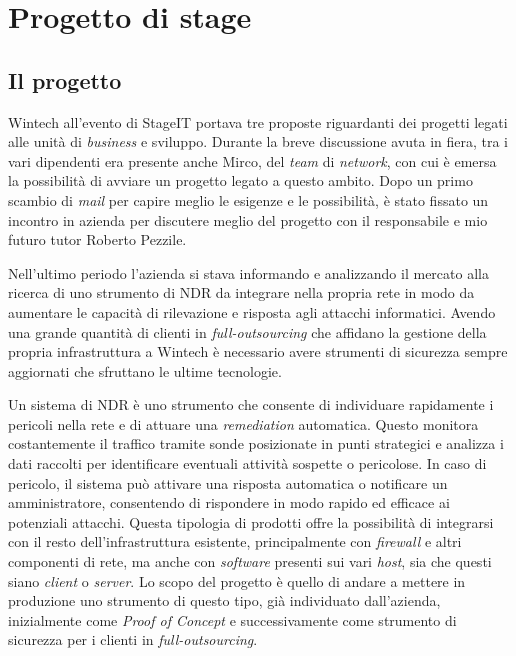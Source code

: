 \chapter{Progetto di stage}
\label{cap:stage}

\section{Il progetto}

Wintech all'evento di StageIT portava tre proposte riguardanti dei progetti legati alle unità di \emph{business} e sviluppo. Durante la breve discussione avuta in fiera, tra i vari dipendenti era presente anche Mirco, del \emph{team} di \emph{network}, con cui è emersa la possibilità di avviare un progetto legato a questo ambito. Dopo un primo scambio di \emph{mail} per capire meglio le esigenze e le possibilità, è stato fissato un incontro in azienda per discutere meglio del progetto con il responsabile e mio futuro tutor Roberto Pezzile.

Nell'ultimo periodo l'azienda si stava informando e analizzando il mercato alla ricerca di uno strumento di NDR da integrare nella propria rete in modo da aumentare le capacità di rilevazione e risposta agli attacchi informatici. Avendo una grande quantità di clienti in \emph{full-outsourcing} che affidano la gestione della propria infrastruttura a Wintech è necessario avere strumenti di sicurezza sempre aggiornati che sfruttano le ultime tecnologie.

Un sistema di NDR è uno strumento che consente di individuare rapidamente i pericoli nella rete e di attuare una \emph{remediation} automatica. Questo monitora costantemente il traffico tramite sonde posizionate in punti strategici e analizza i dati raccolti per identificare eventuali attività sospette o pericolose. In caso di pericolo, il sistema può attivare una risposta automatica o notificare un amministratore, consentendo di rispondere in modo rapido ed efficace ai potenziali attacchi. Questa tipologia di prodotti offre la possibilità di integrarsi con il resto dell'infrastruttura esistente, principalmente con \emph{firewall} e altri componenti di rete, ma anche con \emph{software} presenti sui vari \emph{host}, sia che questi siano \emph{client} o \emph{server}. Lo scopo del progetto è quello di andare a mettere in produzione uno strumento di questo tipo, già individuato dall'azienda, inizialmente come \emph{Proof of Concept} e successivamente come strumento di sicurezza per i clienti in \emph{full-outsourcing}.

